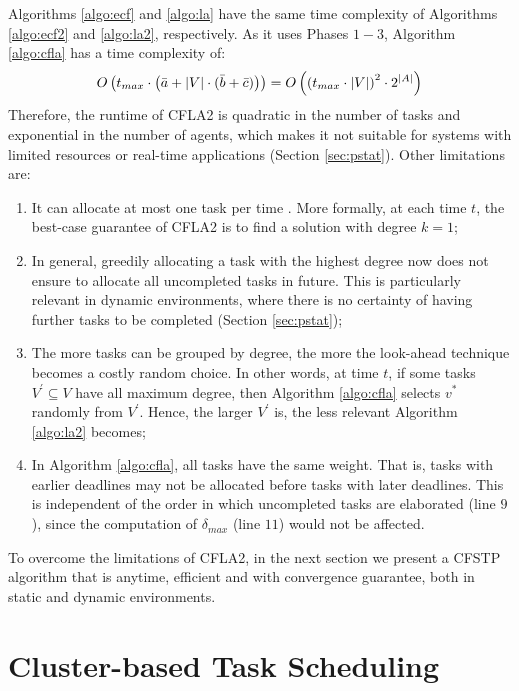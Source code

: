 Algorithms \ref{algo:ecf} and \ref{algo:la} have the same time complexity of Algorithms
\ref{algo:ecf2} and \ref{algo:la2}, respectively. As it uses Phases $1 - 3$, Algorithm
\ref{algo:cfla} has a time complexity of:
\begin{equation}
    O \left(t_{max} \cdot \left( \bar{a} + |V| \cdot (\bar{b} + \bar{c}) \right)
    \right) = O \left( \left(t_{max} \cdot |V|\right)^2 \cdot 2^{|A|} \right)
\end{equation}
Therefore, the runtime of CFLA2 is quadratic in the number of tasks and exponential in the
number of agents, which makes it not suitable for systems with limited resources or
real-time applications (Section \ref{sec:pstat}). Other limitations are:
\begin{enumerate}
    \item
        It can allocate at most one task per time \cite[Section $7$]{ramchurn2010cfstp}.
        More formally, at each time $t$, the best-case guarantee of CFLA2 is to find a
        solution with degree $k = 1$;
    \item
        In general, greedily allocating a task with the highest degree now does not ensure
        to allocate all uncompleted tasks in future. This is particularly relevant in
        dynamic environments, where there is no certainty of having further tasks to be
        completed (Section \ref{sec:pstat});
    \item
        The more tasks can be grouped by degree, the more the look-ahead technique
        becomes a costly random choice. In other words, at time $t$, if some tasks $V^{'}
        \subseteq V$ have all maximum degree, then Algorithm \ref{algo:cfla} selects $v^*$
        randomly from $V^{'}$. Hence, the larger $V^{'}$ is, the less relevant Algorithm
        \ref{algo:la2} becomes;
    \item
        In Algorithm \ref{algo:cfla}, all tasks have the same weight. That is, tasks with
        earlier deadlines may not be allocated before tasks with later deadlines. This is
        independent of the order in which uncompleted tasks are elaborated (line $9$),
        since the computation of $\delta_{max}$ (line $11$) would not be affected.
\end{enumerate}

To overcome the limitations of CFLA2, in the next section we present a CFSTP algorithm
that is anytime, efficient and with convergence guarantee, both in static and dynamic
environments.

\section{Cluster-based Task Scheduling}\label{sec:cts}

